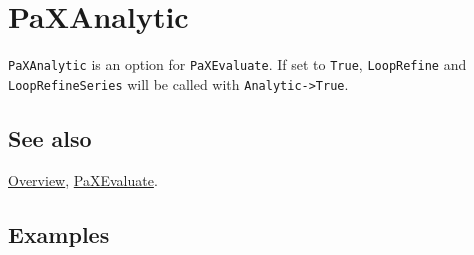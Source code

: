 \documentclass[../FeynHelpersManual.tex]{subfiles}
\begin{document}
\hypertarget{paxanalytic}{
\section{PaXAnalytic}\label{paxanalytic}}

\texttt{PaXAnalytic} is an option for \texttt{PaXEvaluate}. If set to
\texttt{True}, \texttt{LoopRefine} and \texttt{LoopRefineSeries} will be
called with \texttt{Analytic->True}.

\subsection{See also}

\hyperlink{toc}{Overview}, \hyperlink{paxevaluate}{PaXEvaluate}.

\subsection{Examples}
\end{document}
